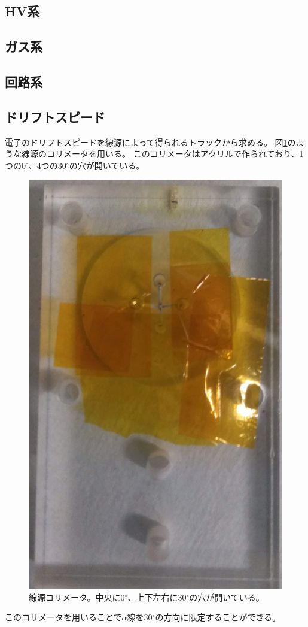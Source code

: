 \subsection{HV系}

\subsection{ガス系}

\subsection{回路系}

\subsection{ドリフトスピード}
電子のドリフトスピードを線源によって得られるトラックから求める。
図\ref{pic::collimator}のような線源のコリメータを用いる。
このコリメータはアクリルで作られており、1つの0${}^{\circ}$、4つの30${}^{\circ}$の穴が開いている。
\begin{figure}
  \centering
  \includegraphics[clip, height=0.7\columnwidth, angle=90]{pic/IMG_20191023_145443_trmd.jpg}
  \caption[線源コリメータ。]
          {線源コリメータ。中央に0${}^{\circ}$、上下左右に30${}^{\circ}$の穴が開いている。}
  \label{pic::collimator}  
\end{figure}
このコリメータを用いることで$\alpha$線を30${}^{\circ}$の方向に限定することができる。
